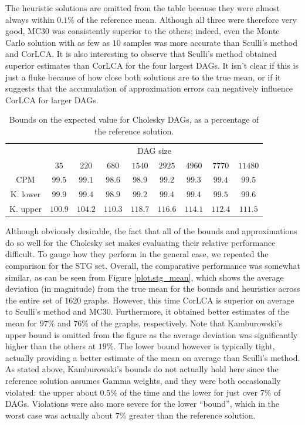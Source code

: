 \documentclass[12pt]{article}
\begin{document}
The heuristic solutions are omitted from the table because they were almost always within $0.1\%$ of the reference mean. Although all three were therefore very good, MC30 was consistently superior to the others; indeed, even the Monte Carlo solution with as few as $10$ samples was more accurate than Sculli's method and CorLCA. It is also interesting to observe that Sculli's method obtained superior estimates than CorLCA for the four largest DAGs. It isn't clear if this is just a fluke because of how close both solutions are to the true mean, or if it suggests that the accumulation of approximation errors can negatively influence CorLCA for larger DAGs.

\begin{table}
	\caption{Bounds on the expected value for Cholesky DAGs, as a percentage of the reference solution.} 
	\begin{center}	
		\begin{tabular}{c c c c c c c c c}
                  \cmidrule{1-9}
                  & \multicolumn{8}{c}{DAG size} \\
                  \cmidrule{2-9}
			& $35$ & $220$ & $680$ & $1540$ & $2925$ & $4960$ & $7770$ & $11480$\\
			\cmidrule{1-9}
			CPM & $99.5$ & $99.1$ & $98.6$ & $98.9$ & $99.2$ & $99.3$ & $99.4$ & $99.5$\\
                  K. lower & $99.9$ & $99.4$ & $98.9$ & $99.2$ & $99.4$ & $99.4$ & $99.5$ & $99.6$\\
                  K. upper & $100.9$ & $104.2$ & $110.3$ & $118.7$ & $116.6$ & $114.1$ & $112.4$ & $111.5$\\
			\bottomrule
		\end{tabular}
		\label{tb.mean_existing}
	\end{center}	
      \end{table}

      Although obviously desirable, the fact that all of the bounds and approximations do so well for the Cholesky set makes evaluating their relative performance difficult. To gauge how they perform in the general case, we repeated the comparison for the STG set. Overall, the comparative performance was somewhat similar, as can be seen from Figure \ref{plot.stg_mean}, which shows the average deviation (in magnitude) from the true mean for the bounds and heuristics across the entire set of $1620$ graphs. However, this time CorLCA is superior on average to Sculli's method and MC30. Furthermore, it obtained better estimates of the mean for $97\%$ and $76\%$ of the graphs, respectively. Note that Kamburowski's upper bound is omitted from the figure as the average deviation was significantly higher than the others at $19\%$. The lower bound however is typically tight, actually providing a better estimate of the mean on average than Sculli's method. As stated above, Kamburowski's bounds do not actually hold here since the reference solution assumes Gamma weights, and they were both occasionally violated: the upper about $0.5\%$ of the time and the lower for just over $7\%$ of DAGs. Violations were also more severe for the lower ``bound'', which in the worst case was actually about $7\%$ greater than the reference solution.     
\end{document}
